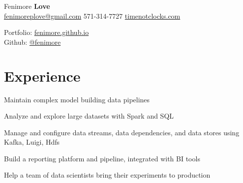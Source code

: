 \documentclass[]{deedy-resume-openfont}
\begin{document}
%
%

%
%
\hspace{-5.5mm}
\begin{minipage}[t]{.6\textwidth}
{\Huge Fenimore {\textbf{Love}}}\\
\href{mailto:fenimoreplove@gmail.com}{fenimoreplove@gmail.com} \textbullet{} 571-314-7727 \textbullet{} \href{https://timenotclocks.com}{timenotclocks.com}\\
\end{minipage}
\hfill
\begin{minipage}[t]{.3\textwidth}
Portfolio: \href{https://fenimore.github.io}{fenimore.github.io}\\
Github: \href{https://github.com/fenimore}{@fenimore}
\end{minipage}
\namesection{}{} %


\section{Experience}
\vspace{\topsep} %
\vspace{\topsep} %
\begin{tightemize}
\item Maintain complex model building data pipelines
\item Analyze and explore large datasets with Spark and SQL
\item Manage and configure data streams, data dependencies, and data stores using Kafka, Luigi, Hdfs
\item Build a reporting platform and pipeline, integrated with BI tools
\item Help a team of data scientists bring their experiments to production
\end{tightemize}
\sectionsep
\end{document}
